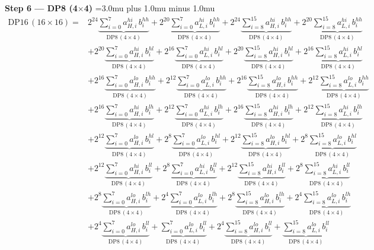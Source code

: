 \documentclass[fleqn]{article}
\newcommand{\DPop}[3]{\mathrm{DP#1}\,(#2\!\times\!#3)}
\begin{document}
\textbf{Step 6 --- DP8 (4$\times$4)}
{\medmuskip=3.0mu plus 1.0mu minus 1.0mu
\begin{align*}
\DPop{16}{16}{16} = {}
  & 2^{24}\underbrace{\sum_{i=0}^{7} a_{H,i}^{hi}\, b_i^{hh}}_{\DPop{8}{4}{4}}
  + 2^{20}\underbrace{\sum_{i=0}^{7} a_{L,i}^{hi}\, b_i^{hh}}_{\DPop{8}{4}{4}}
  + 2^{24}\underbrace{\sum_{i=8}^{15} a_{H,i}^{hi}\, b_i^{hh}}_{\DPop{8}{4}{4}}
  + 2^{20}\underbrace{\sum_{i=8}^{15} a_{L,i}^{hi}\, b_i^{hh}}_{\DPop{8}{4}{4}} \\[1em]
  & + 2^{20}\underbrace{\sum_{i=0}^{7} a_{H,i}^{hi}\, b_i^{hl}}_{\DPop{8}{4}{4}}
  + 2^{16}\underbrace{\sum_{i=0}^{7} a_{L,i}^{hi}\, b_i^{hl}}_{\DPop{8}{4}{4}}
  + 2^{20}\underbrace{\sum_{i=8}^{15} a_{H,i}^{hi}\, b_i^{hl}}_{\DPop{8}{4}{4}}
  + 2^{16}\underbrace{\sum_{i=8}^{15} a_{L,i}^{hi}\, b_i^{hl}}_{\DPop{8}{4}{4}} \\[1em]
  & + 2^{16}\underbrace{\sum_{i=0}^{7} a_{H,i}^{lo}\, b_i^{hh}}_{\DPop{8}{4}{4}}
  + 2^{12}\underbrace{\sum_{i=0}^{7} a_{L,i}^{lo}\, b_i^{hh}}_{\DPop{8}{4}{4}}
  + 2^{16}\underbrace{\sum_{i=8}^{15} a_{H,i}^{lo}\, b_i^{hh}}_{\DPop{8}{4}{4}}
  + 2^{12}\underbrace{\sum_{i=8}^{15} a_{L,i}^{lo}\, b_i^{hh}}_{\DPop{8}{4}{4}} \\[1em]
  & + 2^{16}\underbrace{\sum_{i=0}^{7} a_{H,i}^{hi}\, b_i^{lh}}_{\DPop{8}{4}{4}}
  + 2^{12}\underbrace{\sum_{i=0}^{7} a_{L,i}^{hi}\, b_i^{lh}}_{\DPop{8}{4}{4}}
  + 2^{16}\underbrace{\sum_{i=8}^{15} a_{H,i}^{hi}\, b_i^{lh}}_{\DPop{8}{4}{4}}
  + 2^{12}\underbrace{\sum_{i=8}^{15} a_{L,i}^{hi}\, b_i^{lh}}_{\DPop{8}{4}{4}} \\[1em]
  & + 2^{12}\underbrace{\sum_{i=0}^{7} a_{H,i}^{lo}\, b_i^{hl}}_{\DPop{8}{4}{4}}
  + 2^{8}\underbrace{\sum_{i=0}^{7} a_{L,i}^{lo}\, b_i^{hl}}_{\DPop{8}{4}{4}}
  + 2^{12}\underbrace{\sum_{i=8}^{15} a_{H,i}^{lo}\, b_i^{hl}}_{\DPop{8}{4}{4}}
  + 2^{8}\underbrace{\sum_{i=8}^{15} a_{L,i}^{lo}\, b_i^{hl}}_{\DPop{8}{4}{4}} \\[1em]
  & + 2^{12}\underbrace{\sum_{i=0}^{7} a_{H,i}^{hi}\, b_i^{ll}}_{\DPop{8}{4}{4}}
  + 2^{8}\underbrace{\sum_{i=0}^{7} a_{L,i}^{hi}\, b_i^{ll}}_{\DPop{8}{4}{4}}
  + 2^{12}\underbrace{\sum_{i=8}^{15} a_{H,i}^{hi}\, b_i^{ll}}_{\DPop{8}{4}{4}}
  + 2^{8}\underbrace{\sum_{i=8}^{15} a_{L,i}^{hi}\, b_i^{ll}}_{\DPop{8}{4}{4}} \\[1em]
  & + 2^{8}\underbrace{\sum_{i=0}^{7} a_{H,i}^{lo}\, b_i^{lh}}_{\DPop{8}{4}{4}}
  + 2^{4}\underbrace{\sum_{i=0}^{7} a_{L,i}^{lo}\, b_i^{lh}}_{\DPop{8}{4}{4}}
  + 2^{8}\underbrace{\sum_{i=8}^{15} a_{H,i}^{lo}\, b_i^{lh}}_{\DPop{8}{4}{4}}
  + 2^{4}\underbrace{\sum_{i=8}^{15} a_{L,i}^{lo}\, b_i^{lh}}_{\DPop{8}{4}{4}} \\[1em]
  & + 2^{4}\underbrace{\sum_{i=0}^{7} a_{H,i}^{lo}\, b_i^{ll}}_{\DPop{8}{4}{4}}
  + \underbrace{\sum_{i=0}^{7} a_{L,i}^{lo}\, b_i^{ll}}_{\DPop{8}{4}{4}}
  + 2^{4}\underbrace{\sum_{i=8}^{15} a_{H,i}^{lo}\, b_i^{ll}}_{\DPop{8}{4}{4}}
  + \underbrace{\sum_{i=8}^{15} a_{L,i}^{lo}\, b_i^{ll}}_{\DPop{8}{4}{4}}
\end{align*}
}
\end{document}
